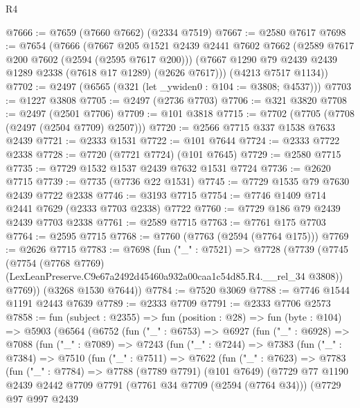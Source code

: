 \begin{lexlean}{R4}
\begin{coremodule}
@7666 := @7659 (@7660 @7662) (@2334 @7519)
@7667 := @2580 @7617
@7698 := @7654
    (@7666
      (@7667
        @205
        @1521
        @2439
        @2441
        @7602
        @7662
        (@2589 @7617 @200 @7602 (@2594 (@2595 @7617 @200)))
        (@7667 @1290 @79 @2439 @2439 @1289 @2338 (@7618 @17 @1289) (@2626 @7617)))
      (@4213 @7517 @1134))
@7702 := @2497 (@6565 (@321 (let _ywiden0 : @104 := @3808; @4537)))
@7703 := @1227 @3808
@7705 := @2497 (@2736 @7703)
@7706 := @321 @3820
@7708 := @2497 (@2501 @7706)
@7709 := @101 @3818
@7715 := @7702 (@7705 (@7708 (@2497 (@2504 @7709) @2507)))
@7720 := @2566 @7715 @337 @1538 @7633 @2439
@7721 := @2333 @1531
@7722 := @101 @7644
@7724 := @2333 @7722 @2338
@7728 := @7720 (@7721 @7724) (@101 @7645)
@7729 := @2580 @7715
@7735 := @7729 @1532 @1537 @2439 @7632 @1531 @7724
@7736 := @2620 @7715
@7739 := @7735 (@7736 @22 @1531)
@7745 := @7729 @1535 @79 @7630 @2439 @7722 @2338
@7746 := @3193 @7715
@7754 := @7746 @1409 @714 @2441 @7629 (@2333 @7703 @2338) @7722
@7760 := @7729 @186 @79 @2439 @2439 @7703 @2338
@7761 := @2589 @7715
@7763 := @7761 @175 @7703
@7764 := @2595 @7715
@7768 := @7760 (@7763 (@2594 (@7764 @175)))
@7769 := @2626 @7715
@7783 := @7698
    (fun ("_" : @7521) =>
    @7728
      (@7739
        (@7745
          (@7754
            (@7768 @7769)
            (LexLeanPreserve.C9e67a2492d45460a932a00caa1c54d85.R4.__rel_34 @3808))
          @7769))
      (@3268 @1530 @7644))
@7784 := @7520 @3069
@7788 := @7746 @1544 @1191 @2443 @7639
@7789 := @2333 @7709
@7791 := @2333 @7706 @2573
@7858 := fun (subject : @2355) =>
  fun (position : @28) =>
  fun (byte : @104) =>
  @5903
    (@6564
      (@6752
        (fun ("_" : @6753) =>
        @6927
          (fun ("_" : @6928) =>
          @7088
            (fun ("_" : @7089) =>
            @7243
              (fun ("_" : @7244) =>
              @7383
                (fun ("_" : @7384) =>
                @7510
                  (fun ("_" : @7511) =>
                  @7622
                    (fun ("_" : @7623) =>
                    @7783
                      (fun ("_" : @7784) =>
                      @7788
                        (@7789 @7791)
                        (@101 @7649)
                        (@7729
                          @77
                          @1190
                          @2439
                          @2442
                          @7709
                          @7791
                          (@7761 @34 @7709 (@2594 (@7764 @34)))
                          (@7729
                            @97
                            @997
                            @2439

\end{coremodule}
\end{lexlean}
